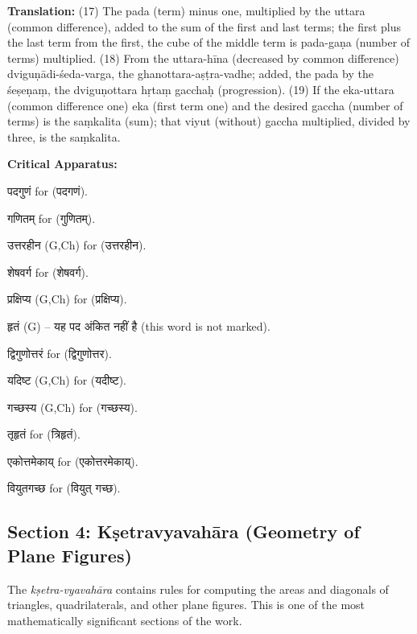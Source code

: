 \documentclass[11pt,a4paper]{article}
\newcommand{\dev}[1]{{\devanagarifont #1}}
\newenvironment{variants}{%
  \small%
  \color{varecolor}%
  \list{}{\leftmargin=2em\itemindent=-1em}%
}{\endlist}
\begin{document}
\textbf{Translation:} (17) The pada (term) minus one, multiplied by the uttara 
(common difference), added to the sum of the first and last terms; the first plus 
the last term from the first, the cube of the middle term is pada-gaṇa (number of 
terms) multiplied. (18) From the uttara-hīna (decreased by common difference) 
dviguṇādi-śeda-varga, the ghanottara-aṣṭra-vadhe; added, the pada by the śeṣeṇaṃ, 
the dviguṇottara hṛtaṃ gacchaḥ (progression). (19) If the eka-uttara (common 
difference one) eka (first term one) and the desired gaccha (number of terms) is 
the saṃkalita (sum); that viyut (without) gaccha multiplied, divided by three, 
is the saṃkalita.

\textcolor{varecolor}{\textbf{Critical Apparatus:}}
\begin{variants}
\item[17.1] \dev{पदगुणं} \dev{for} (\dev{पदगणं}).
\item[17.2] \dev{गणितम्} \dev{for} (\dev{गुणितम्}).
\item[18.1] \dev{उत्तरहीन} (G,Ch) \dev{for} (\dev{उत्तरहीन}).
\item[18.2] \dev{शेषवर्ग} \dev{for} (\dev{शेषवर्ग}).
\item[18.3] \dev{प्रक्षिप्य} (G,Ch) \dev{for} (\dev{प्रक्षिप्य}).
\item[18.4] \dev{हृतं} (G) -- \dev{यह पद अंकित नहीं है} (this word is not marked).
\item[18.5] \dev{द्विगुणोत्तरं} \dev{for} (\dev{द्विगुणोत्तर}).
\item[19.1] \dev{यदिष्ट} (G,Ch) \dev{for} (\dev{यदीष्ट}).
\item[19.2] \dev{गच्छस्य} (G,Ch) \dev{for} (\dev{गच्छस्य}).
\item[19.3] \dev{तृहृतं} \dev{for} (\dev{त्रिहृतं}).
\item[19.4] \dev{एकोत्तमेकाय्} \dev{for} (\dev{एकोत्तरमेकाय्}).
\item[19.5] \dev{वियुतगच्छ} \dev{for} (\dev{वियुत् गच्छ}).
\end{variants}

\subsection*{Section 4: Kṣetravyavahāra (Geometry of Plane Figures)}

The \textit{kṣetra-vyavahāra} contains rules for computing the areas and diagonals 
of triangles, quadrilaterals, and other plane figures. This is one of the most 
mathematically significant sections of the work.
\end{document}
